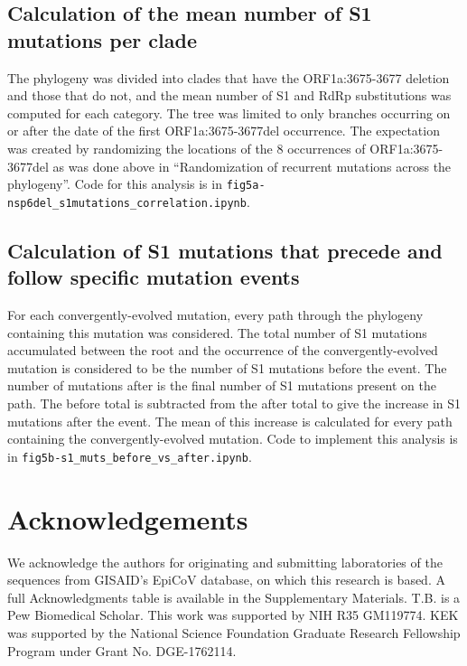 \documentclass[11pt,oneside,letterpaper]{article}
\begin{document}
\subsection*{Calculation of the mean number of S1 mutations per clade}
The phylogeny was divided into clades that have the ORF1a:3675-3677 deletion and those that do not, and the mean number of S1 and RdRp substitutions was computed for each category. The tree was limited to only branches occurring on or after the date of the first ORF1a:3675-3677del occurrence. The expectation was created by randomizing the locations of the 8 occurrences of ORF1a:3675-3677del as was done above in “Randomization of recurrent mutations across the phylogeny”. Code for this analysis is in \texttt{fig5a-nsp6del\_s1mutations\_correlation.ipynb}.

\subsection*{Calculation of S1 mutations that precede and follow specific mutation events}
For each convergently-evolved mutation, every path through the phylogeny containing this mutation was considered. The total number of S1 mutations accumulated between the root and the occurrence of the convergently-evolved mutation is considered to be the number of S1 mutations before the event. The number of mutations after is the final number of S1 mutations present on the path. The before total is subtracted from the after total to give the increase in S1 mutations after the event. The mean of this increase is calculated for every path containing the convergently-evolved mutation. Code to implement this analysis is in \texttt{fig5b-s1\_muts\_before\_vs\_after.ipynb}.

\section*{Acknowledgements}
\fussy
We acknowledge the authors for originating and submitting laboratories of the sequences from GISAID’s EpiCoV database, on which this research is based. A full Acknowledgments table is available in the Supplementary Materials. T.B. is a Pew Biomedical Scholar. This work was supported by NIH R35 GM119774. KEK was supported by the National Science Foundation Graduate Research Fellowship Program under Grant No. DGE-1762114.

\small


\normalsize
\clearpage
\end{document}
